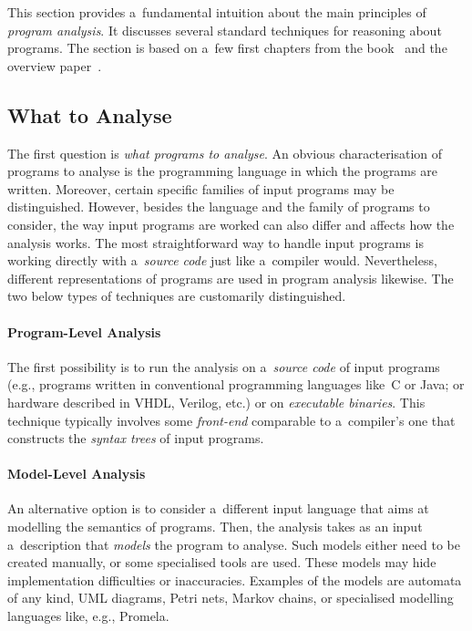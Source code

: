 This section provides a~fundamental intuition about the main principles of \emph{program analysis}. It discusses several standard techniques for reasoning about programs. The section is based on a~few first chapters from the book~\cite{staticAnalysisRival} and the overview paper~\cite{analysisAndVerVojnarKrena}.

\subsection{What to Analyse}

The first question is \emph{what programs to analyse}. An obvious characterisation of programs to analyse is the programming language in which the programs are written. Moreover, certain specific families of input programs may be distinguished. However, besides the language and the family of programs to consider, the way input programs are worked can also differ and affects how the analysis works. The most straightforward way to handle input programs is working directly with a~\emph{source code} just like a~compiler would. Nevertheless, different representations of programs are used in program analysis likewise. The two below types of techniques are customarily distinguished.

\paragraph{Program-Level Analysis}
The first possibility is to run the analysis on a~\emph{source code} of input programs (e.g., programs written in conventional programming languages like~C or Java; or hardware described in VHDL, Verilog, etc.) or on \emph{executable binaries}. This technique typically involves some \emph{front-end} comparable to a~compiler's one that constructs the \emph{syntax trees} of input programs.

\paragraph{Model-Level Analysis}
An alternative option is to consider a~different input language that aims at modelling the semantics of programs. Then, the analysis takes as an input a~description that \emph{models} the program to analyse. Such models either need to be created manually, or some specialised tools are used. These models may hide implementation difficulties or inaccuracies. Examples of the models are automata of any kind, UML diagrams, Petri nets, Markov chains, or specialised modelling languages like, e.g., Promela.

